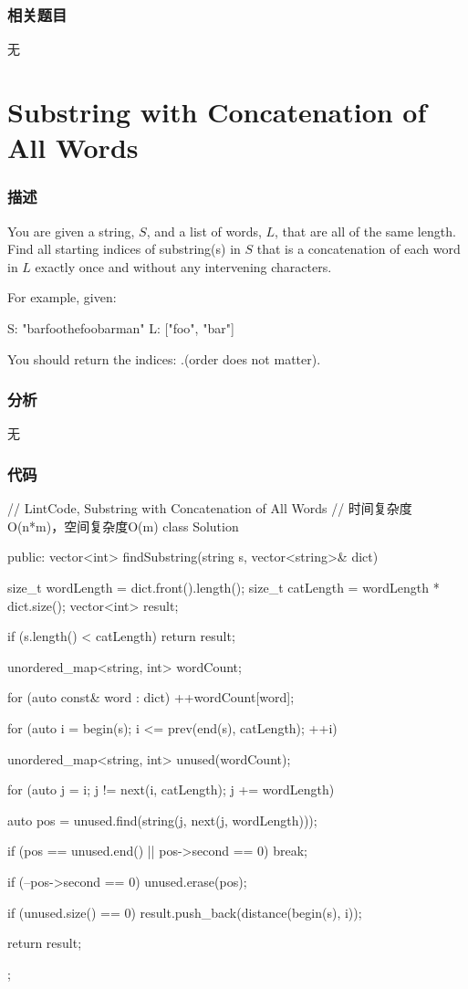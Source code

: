 \subsubsection{相关题目}

\begindot
\item 无
\myenddot


\section{Substring with Concatenation of All Words} %
\label{sec:substring-with-concatenation-of-all-words}


\subsubsection{描述}
You are given a string, $S$, and a list of words, $L$, that are all of the same length. Find all starting indices of substring(s) in $S$ that is a concatenation of each word in $L$ exactly once and without any intervening characters.

For example, given: 
\begin{Code}
S: "barfoothefoobarman"
L: ["foo", "bar"]
\end{Code}

You should return the indices: \code{[0,9]}.(order does not matter).


\subsubsection{分析}
无


\subsubsection{代码}
\begin{Code}
// LintCode, Substring with Concatenation of All Words
// 时间复杂度O(n*m)，空间复杂度O(m)
class Solution {
public:
    vector<int> findSubstring(string s, vector<string>& dict) {
        size_t wordLength = dict.front().length();
        size_t catLength = wordLength * dict.size();
        vector<int> result;

        if (s.length() < catLength) return result;

        unordered_map<string, int> wordCount;

        for (auto const& word : dict) ++wordCount[word];

        for (auto i = begin(s); i <= prev(end(s), catLength); ++i) {
            unordered_map<string, int> unused(wordCount);

            for (auto j = i; j != next(i, catLength); j += wordLength) {
                auto pos = unused.find(string(j, next(j, wordLength)));

                if (pos == unused.end() || pos->second == 0) break;

                if (--pos->second == 0) unused.erase(pos);
            }

            if (unused.size() == 0) result.push_back(distance(begin(s), i));
        }

        return result;
    }
};
\end{Code}


